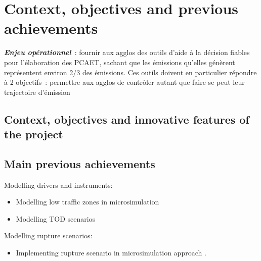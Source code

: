 \section{Context, objectives and previous achievements}

\textit{\textbf{Enjeu opérationnel}} : fournir aux agglos des outils d’aide à la décision fiables pour l’élaboration des PCAET, sachant que les émissions qu’elles génèrent représentent environ 2/3 des émissions. Ces outils doivent en particulier répondre à 2 objectifs : permettre aux agglos de contrôler autant que faire se peut leur trajectoire d’émission




\subsection{Context, objectives and innovative features of the project
}




\subsection{Main previous achievements}

Modelling drivers and instruments:
\begin{itemize}
    \item Modelling low traffic zones in microsimulation \cite{yinEvaluationLowTrafficNeighborhoods2023}
    \item Modelling TOD scenarios \cite{liuTransportLandUse2014, feudoHowBuildAlternative2014}
\end{itemize}

Modelling rupture scenarios:
\begin{itemize}
    \item Implementing rupture scenario in microsimulation approach \cite{kilaniEnvironmentalImpactsBicycling2023}.
\end{itemize}

